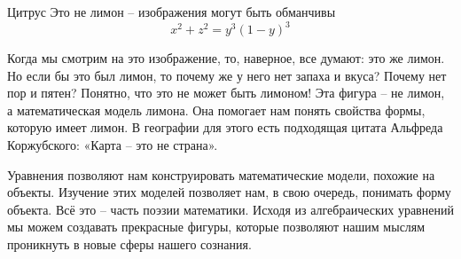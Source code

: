 \begin{surferPage}{Цитрус}
Это не лимон – изображения могут быть обманчивы\\
\smallskip
\[x^2 + z^2 = y^3 (1 - y)^3\] 


\singlespacing
Когда мы смотрим на это изображение, то, наверное, все думают: это же лимон. Но если бы это был лимон, то почему же у него нет запаха и вкуса? Почему нет пор и пятен? Понятно, что это не может быть лимоном!
\singlespacing
Эта фигура – не лимон, а математическая модель лимона. Она помогает нам понять свойства формы, которую имеет лимон. В географии для этого есть подходящая цитата Альфреда Коржубского: «Карта – это не страна».\\
\singlespacing

Уравнения позволяют нам конструировать математические модели, похожие на объекты. Изучение этих моделей позволяет нам, в свою очередь, понимать форму объекта.
\singlespacing
Всё это – часть поэзии математики. Исходя из алгебраических уравнений мы можем создавать прекрасные фигуры, которые позволяют нашим мыслям проникнуть в новые сферы нашего сознания.
\end{surferPage}

